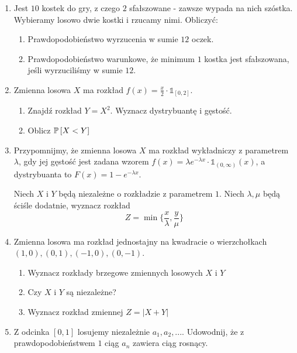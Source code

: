 \documentclass{article}
\begin{document}
\begin{enumerate}
    \item Jest $10$ kostek do gry, z czego $2$ sfałszowane - zawsze wypada na nich szóstka. Wybieramy losowo dwie kostki i rzucamy nimi. Obliczyć:
    \begin{enumerate}
        \item Prawdopodobieństwo wyrzucenia w sumie $12$ oczek.
        \item Prawdopodobieństwo warunkowe, że minimum $1$ kostka jest sfałszowana, jeśli wyrzuciliśmy w sumie $12$.
    \end{enumerate}
    \item Zmienna losowa $X$ ma rozkład $f(x)=\frac{x}{2}\cdot\mathbb{1}_{[0,2]}$.
    \begin{enumerate}
        \item Znajdź rozkład $Y=X^2$. Wyznacz dystrybuantę i gęstość.
        \item Oblicz $\prob{X<Y}$
    \end{enumerate}
    \item Przypomnijmy, że zmienna losowa $X$ ma rozkład wykładniczy z parametrem $\lambda$, gdy jej gęstość jest zadana wzorem $f(x)=\lambda e^{-\lambda x}\cdot\mathds{1}_{(0,\infty)}(x)$, a dystrybuanta to $F(x)=1-e^{-\lambda x}$.

    Niech $X$ i $Y$ będą niezależne o rozkładzie z parametrem $1$. Niech $\lambda,\mu$ będą ściśle dodatnie, wyznacz rozkład
    $$Z=\min\{\frac{x}{\lambda},\frac{y}{\mu}\}$$
    \item Zmienna losowa ma rozkład jednostajny na kwadracie o wierzchołkach $(1, 0), (0, 1), (-1, 0), (0, -1)$.
    \begin{enumerate}
        \item Wyznacz rozkłady brzegowe zmiennych losowych $X$ i $Y$
        \item Czy $X$ i $Y$ są niezależne?
        \item Wyznacz rozkład zmiennej $Z=|X+Y|$
    \end{enumerate}
    \item Z odcinka $[0,1]$ losujemy niezależnie $a_1,a_2,...$. Udowodnij, że z prawdopodobieństwem $1$ ciąg $a_n$ zawiera ciąg rosnący.
\end{enumerate}
\end{document}
